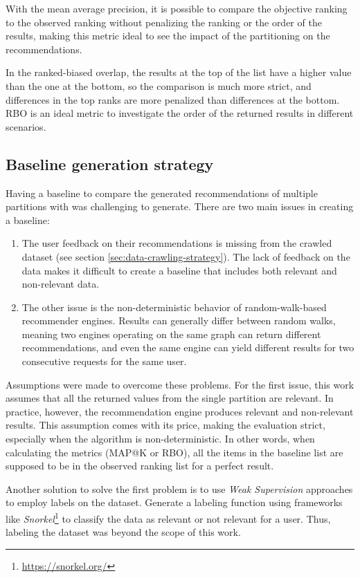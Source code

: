 With the mean average precision, it is possible to compare the objective ranking to the observed ranking without penalizing the ranking or the order of the results, making this metric ideal to see the impact of the partitioning on the recommendations.


In the ranked-biased overlap, the results at the top of the list have a higher value than the one at the bottom, so the comparison is much more strict, and differences in the top ranks are more penalized than differences at the bottom. RBO is an ideal metric to investigate the order of the returned results in different scenarios.


\subsection{Baseline generation strategy}
\label{subsec:baseline-generation}
Having a baseline to compare the generated recommendations of multiple partitions with was challenging to generate. There are two main issues in creating a baseline:
\begin{enumerate}
    \item The user feedback on their recommendations is missing from the crawled dataset (see section \ref{sec:data-crawling-strategy}). The lack of feedback on the data makes it difficult to create a baseline that includes both relevant and non-relevant data.
    
    \item The other issue is the non-deterministic behavior of random-walk-based recommender engines. Results can generally differ between random walks, meaning two engines operating on the same graph can return different recommendations, and even the same engine can yield different results for two consecutive requests for the same user.
\end{enumerate}

Assumptions were made to overcome these problems. For the first issue, this work assumes that all the returned values from the single partition are relevant. In practice, however, the recommendation engine produces relevant and non-relevant results. This assumption comes with its price, making the evaluation strict, especially when the algorithm is non-deterministic. In other words, when calculating the metrics (MAP@K or RBO), all the items in the baseline list are supposed to be in the observed ranking list for a perfect result.


Another solution to solve the first problem is to use \emph{Weak Supervision} approaches to employ labels on the dataset. Generate a labeling function using frameworks like \emph{Snorkel}\footnote{\url{https://snorkel.org/}} to classify the data as relevant or not relevant for a user. Thus, labeling the dataset was beyond the scope of this work.



